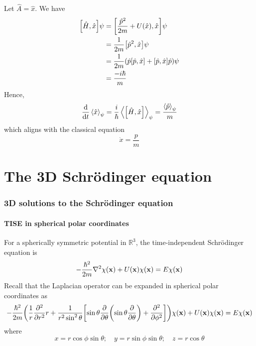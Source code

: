 \documentclass[a4paper,11pt]{article}
\begin{document}
\begin{example}
	Let \( \hat A = \hat x \).
	We have
	\begin{align*}
		\qty[\hat H, \hat x] \psi & = \qty[\frac{\hat p^2}{2m} + U(\hat x), \hat x] \psi                                 \\
		                          & = \frac{1}{2m} \qty[\hat p^2, \hat x] \psi                                           \\
		                          & = \frac{1}{2m} \qty( \hat p \qty[\hat p, \hat x] + \qty[\hat p, \hat x] \hat p) \psi \\
		                          & = \frac{-i\hbar}{m}
	\end{align*}
	Hence,
	\[
		\dv{t}\left\langle{\hat x}\right\rangle_\psi = \frac{i}{\hbar} \left\langle{\qty[\hat H, \hat x]}\right\rangle_\psi = \frac{\left\langle{\hat p}\right\rangle_\psi}{m}
	\]
	which aligns with the classical equation
	\[
		\dot x = \frac{p}{m}
	\]
\end{example}
\clearpage
\part{The 3D Schr\"odinger equation}
\section{3D solutions to the Schr\"odinger equation}
\subsection{TISE in spherical polar coordinates}

For a spherically symmetric potential in \( \mathbb R^3 \), the time-independent Schr\"odinger equation is
\[
	-\frac{\hbar^2}{2m} \laplacian{\chi(\bfx)} + U(\bfx) \chi(\bfx) = E\chi(\bfx)
\]
Recall that the Laplacian operator can be expanded in spherical polar coordinates as
\[
	-\frac{\hbar^2}{2m} \qty( \frac{1}{r} \pdv[2]{r} r + \frac{1}{r^2\sin^2\theta}\qty[\sin \theta \pdv{\theta}\qty(\sin\theta \pdv{\theta}) + \pdv[2]{\phi}] )\chi({\bf x}) + U({\bf x}) \chi({\bf x}) = E\chi({\bf x})
\]
where
\[
	x = r \cos \phi \sin \theta; \quad y = r \sin \phi \sin \theta;\quad z = r \cos \theta
\]
\end{document}
